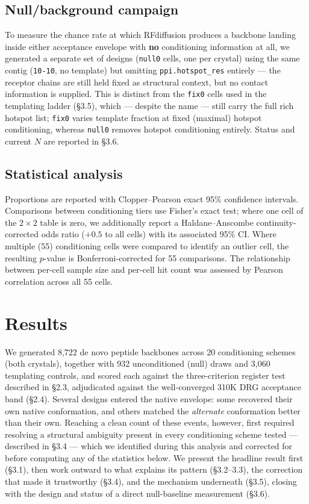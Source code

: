 \documentclass[letterpaper]{article}
\begin{document}
\subsection{Null/background campaign}

To measure the chance rate at which RFdiffusion produces a backbone landing inside either acceptance
envelope with \textbf{no} conditioning information at all, we generated a separate set of designs
(\texttt{null0} cells, one per crystal) using the same contig (\texttt{10-10}, no template) but omitting
\texttt{ppi.hotspot\_res} entirely --- the receptor chains are still held fixed as structural context, but
no contact information is supplied. This is distinct from the \texttt{fix0} cells used in the templating
ladder (\S3.5), which --- despite the name --- still carry the full rich hotspot list; \texttt{fix0}
varies template fraction at fixed (maximal) hotspot conditioning, whereas \texttt{null0} removes hotspot
conditioning entirely. Status and current $N$ are reported in \S3.6.

\subsection{Statistical analysis}

Proportions are reported with Clopper--Pearson exact 95\% confidence intervals. Comparisons between
conditioning tiers use Fisher's exact test; where one cell of the $2\times2$ table is zero, we additionally
report a Haldane--Anscombe continuity-corrected odds ratio ($+0.5$ to all cells) with its associated 95\%
CI. Where multiple (55) conditioning cells were compared to identify an outlier cell, the resulting
$p$-value is Bonferroni-corrected for 55 comparisons. The relationship between per-cell sample size and
per-cell hit count was assessed by Pearson correlation across all 55 cells.

\section{Results}

We generated 8{,}722 de novo peptide backbones across 20 conditioning schemes (both crystals), together
with 932 unconditioned (null) draws and 3{,}060 templating controls, and scored each against the
three-criterion register test described in \S2.3, adjudicated against the well-converged 310K DRG
acceptance band (\S2.4). Several designs entered the native envelope: some recovered their own native
conformation, and others matched the \textit{alternate} conformation better than their own. Reaching a
clean count of these events, however, first required resolving a structural ambiguity present in every
conditioning scheme tested --- described in \S3.4 --- which we identified during this analysis and
corrected for before computing any of the statistics below. We present the headline result first
(\S3.1), then work outward to what explains its pattern (\S3.2--3.3), the correction that made it
trustworthy (\S3.4), and the mechanism underneath (\S3.5), closing with the design and status of a direct
null-baseline measurement (\S3.6).
\end{document}
